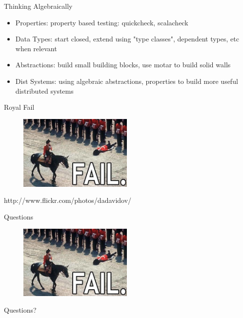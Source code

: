 \documentclass[compress]{beamer}
\begin{document}
\begin{frame}{Thinking Algebraically}
\begin{itemize}
  \item \Large{Properties:} \small{property based testing: quickcheck, scalacheck} \newline
  \item \Large{Data Types:} \small{start closed, extend using "type classes", dependent types, etc when relevant} \newline
  \item \large{Abstractions:} \small{build small building blocks, use motar to build solid walls} \newline
  \item \large{Dist Systems:} \small{using algebraic abstractions, properties to build more useful distributed systems} \newline
\end{itemize}
\end{frame}

\begin{frame}{Royal Fail}
  \begin{figure}
    \centering
    \includegraphics[width=0.5\textwidth]{assets/royal_fail.jpg}
  \end{figure}
  \tiny{http://www.flickr.com/photos/dadavidov/}
\end{frame}

\begin{frame}{Questions}
  \begin{figure}
    \centering
    \includegraphics[width=0.5\textwidth]{assets/royal_fail.jpg}
  \end{figure}
  \Large{Questions?}
\end{frame}
\end{document}
